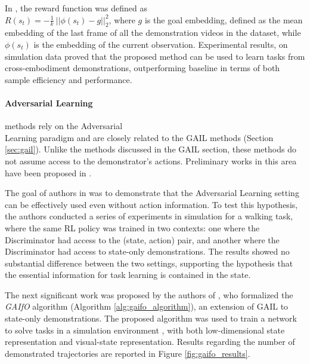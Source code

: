 
In \cite{zakka2022xirl}, the reward function was defined as \\ $R(s_{t}) = -\frac{1}{k} \ || \phi(s_{t}) - g||^{2}_{2}$, where $g$ is the goal embedding, defined as the mean embedding of the last frame of all the demonstration videos in the dataset, while $\phi(s_{t})$ is the embedding of the current observation. Experimental results, on simulation data proved that the proposed method can be used to learn tasks from cross-embodiment demonstrations, outperforming baseline \cite{sermanet2018time_contrastive} in terms of both sample efficiency and performance.


\paragraph*{Adversarial Learning} methods rely on the Adversarial \\ Learning paradigm and are closely related to the GAIL methods (Section \ref{sec:gail}). Unlike the methods discussed in the GAIL section, these methods do not assume access to the demonstrator's actions. Preliminary works in this area have been proposed in \cite{merel2017learning,torabi2018gaifo}.

The goal of authors in \cite{merel2017learning} was to demonstrate that the Adversarial Learning setting can be effectively used even without action information. To test this hypothesis, the authors conducted a series of experiments in simulation for a walking task, where the same RL policy was trained in two contexts: one where the Discriminator had access to the (state, action) pair, and another where the Discriminator had access to state-only demonstrations. The results showed no substantial difference between the two settings, supporting the hypothesis that the essential information for task learning is contained in the state.



The next significant work was proposed by the authors of \cite{torabi2018gaifo}, who formalized the \textit{GAIfO} algorithm (Algorithm \ref{alg:gaifo_algorithm}), an extension of GAIL \cite{ho2016gail} to state-only demonstrations. The proposed algorithm was used to train a network to solve tasks in a simulation environment \cite{brockman2016openai}, with both low-dimensional state representation and visual-state representation. Results regarding the number of demonstrated trajectories are reported in Figure \ref{fig:gaifo_results}.

